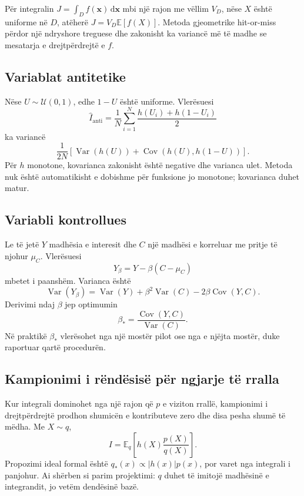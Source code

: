 \documentclass[11pt,oneside,openany]{book}
\newcommand{\vect}[1]{\bm{#1}}
\newcommand{\E}{\mathbb{E}}
\newcommand{\Var}{\operatorname{Var}}
\newcommand{\Cov}{\operatorname{Cov}}
\newcommand{\dd}{\,\mathrm{d}}
\begin{document}
Për integralin $J=\int_D f(\vect x)\dd\vect x$ mbi një rajon me vëllim $V_D$, nëse $X$ është uniforme në $D$, atëherë $J=V_D\E[f(X)]$. Metoda gjeometrike hit-or-miss përdor një ndryshore treguese dhe zakonisht ka variancë më të madhe se mesatarja e drejtpërdrejtë e $f$.

\subsection{Variablat antitetike}
Nëse $U\sim\mathcal U(0,1)$, edhe $1-U$ është uniforme. Vlerësuesi
\begin{equation}
 \widehat I_{\mathrm{anti}}=\frac1N\sum_{i=1}^{N}
 \frac{h(U_i)+h(1-U_i)}{2}
\end{equation}
ka variancë
\begin{equation}
 \frac{1}{2N}\left[\Var(h(U))+\Cov(h(U),h(1-U))\right].
\end{equation}
Për $h$ monotone, kovarianca zakonisht është negative dhe varianca ulet. Metoda nuk është automatikisht e dobishme për funksione jo monotone; kovarianca duhet matur.

\subsection{Variabli kontrollues}
Le të jetë $Y$ madhësia e interesit dhe $C$ një madhësi e korreluar me pritje të njohur $\mu_C$. Vlerësuesi
\begin{equation}
 Y_\beta=Y-\beta(C-\mu_C)
\end{equation}
mbetet i paanshëm. Varianca është
\begin{equation}
 \Var(Y_\beta)=\Var(Y)+\beta^2\Var(C)-2\beta\Cov(Y,C).
\end{equation}
Derivimi ndaj $\beta$ jep optimumin
\begin{equation}
 \beta_*=\frac{\Cov(Y,C)}{\Var(C)}.
\end{equation}
Në praktikë $\beta_*$ vlerësohet nga një mostër pilot ose nga e njëjta mostër, duke raportuar qartë procedurën.

\subsection{Kampionimi i rëndësisë për ngjarje të rralla}
Kur integrali dominohet nga një rajon që $p$ e viziton rrallë, kampionimi i drejtpërdrejtë prodhon shumicën e kontributeve zero dhe disa pesha shumë të mëdha. Me $X\sim q$,
\begin{equation}
 I=\E_q\left[h(X)\frac{p(X)}{q(X)}\right].
\end{equation}
Propozimi ideal formal është $q_*(x)\propto|h(x)|p(x)$, por varet nga integrali i panjohur. Ai shërben si parim projektimi: $q$ duhet të imitojë madhësinë e integrandit, jo vetëm dendësinë bazë.
\end{document}
